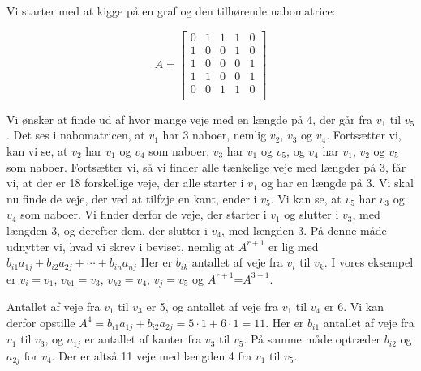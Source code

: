 \begin{exmp}
Vi starter med at kigge på en graf og den tilhørende nabomatrice:


\begin{equation}
A=\begin{bmatrix}
    0&1&1&1&0\\
    1&0&0&1&0\\
    1&0&0&0&1\\
    1&1&0&0&1\\
    0&0&1&1&0\\
\end{bmatrix}
\end{equation}


Vi ønsker at finde ud af hvor mange veje med en længde på 4, der går fra $v_1$ til $v_5$. Det ses i nabomatricen, at $v_1$ har 3 naboer, nemlig $v_2$, $v_3$ og $v_4$. Fortsætter vi, kan vi se, at $v_2$ har $v_1$ og $v_4$ som naboer, $v_3$ har $v_1$ og $v_5$, og $v_4$ har $v_1$, $v_2$ og $v_5$ som naboer. Fortsætter vi, så vi finder alle tænkelige veje med længder på 3, får vi, at der er 18 forskellige veje, der alle starter i $v_1$ og har en længde på 3. Vi skal nu finde de veje, der ved at tilføje en kant, ender i $v_5$. Vi kan se, at $v_5$ har $v_3$ og $v_4$ som naboer. Vi finder derfor de veje, der starter i $v_1$ og slutter i $v_3$, med længden 3, og derefter dem, der slutter i $v_4$, med længden 3. På denne måde udnytter vi, hvad vi skrev i beviset, nemlig at
\textbf{$A^{r+1}$} er lig med $b_{i1}a_{1j} + b_{i2}a_{2j} +\cdots+ b_{in}a_{nj}$
Her er $b_{ik}$ antallet af veje fra $v_{i}$ til ${v_k}$. I vores eksempel er $v_{i}=v_{1}$, ${v_{k1}}=v_{3}$, ${v_{k2}}=v_{4}$, $v_{j}=v_{5}$ og \textbf{$A^{r+1}$}=\textbf{$A^{3+1}$}. 
 


Antallet af veje fra $v_{1}$ til $v_{3}$ er 5, og antallet af veje fra $v_{1}$ til $v_{4}$ er 6. Vi kan derfor opstille
\textbf{$A^{4}$}$=b_{i1} a_{1j}+b_{i2} a_{2j}=5 \cdot 1+6 \cdot 1=11$.
Her er $b_{i1}$ antallet af veje fra $v_{1}$ til $v_{3}$, og $a_{1j}$ er antallet af kanter fra $v_{3}$ til  $v_{5}$. På samme måde optræder $b_{i2}$ og $a_{2j}$ for $v_{4}$. Der er altså 11 veje med længden 4 fra $v_{1}$ til $v_{5}$.

\end{exmp}

